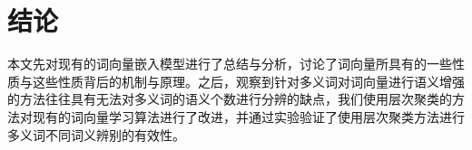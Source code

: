 \iffalse



\fi

\chapter{结论}

本文先对现有的词向量嵌入模型进行了总结与分析，讨论了词向量所具有的一些性质与这些性质背后的机制与原理。之后，观察到针对多义词对词向量进行语义增强的方法往往具有无法对多义词的语义个数进行分辨的缺点，我们使用层次聚类的方法对现有的词向量学习算法进行了改进，并通过实验验证了使用层次聚类方法进行多义词不同词义辨别的有效性。